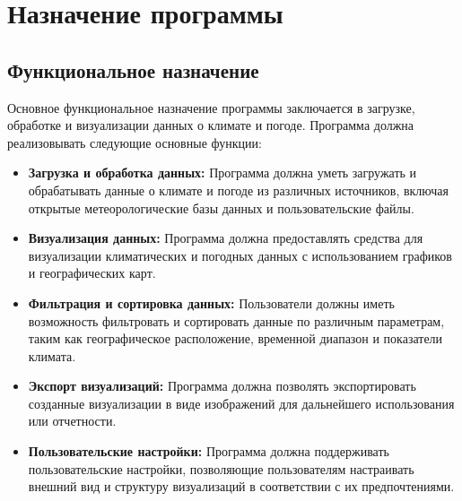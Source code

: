 \documentclass[a4paper, 12pt]{article}
\begin{document}
	\sloppy {}   
	 \firstPage
	\newpage
	\thirdPage

	\section{Назначение программы}
	\subsection{Функциональное назначение}
	Основное функциональное назначение программы заключается в загрузке, обработке и визуализации данных о климате и
	погоде. Программа должна реализовывать следующие основные функции:
	\begin{itemize}
		\item \textbf{Загрузка и обработка данных:} Программа должна уметь загружать и обрабатывать данные о климате и
			погоде из различных источников, включая открытые метеорологические базы данных и пользовательские файлы.

		\item \textbf{Визуализация данных:} Программа должна предоставлять средства для визуализации климатических и
			погодных данных с использованием графиков и географических карт.

		\item \textbf{Фильтрация и сортировка данных:} Пользователи должны иметь возможность фильтровать и сортировать
			данные по различным параметрам, таким как географическое расположение, временной диапазон и показатели климата.

		\item \textbf{Экспорт визуализаций:} Программа должна позволять экспортировать созданные визуализации в виде
			изображений для дальнейшего использования или отчетности.

		\item \textbf{Пользовательские настройки:} Программа должна поддерживать пользовательские настройки, позволяющие пользователям
			настраивать внешний вид и структуру визуализаций в соответствии с их предпочтениями.
	\end{itemize}
\end{document}
